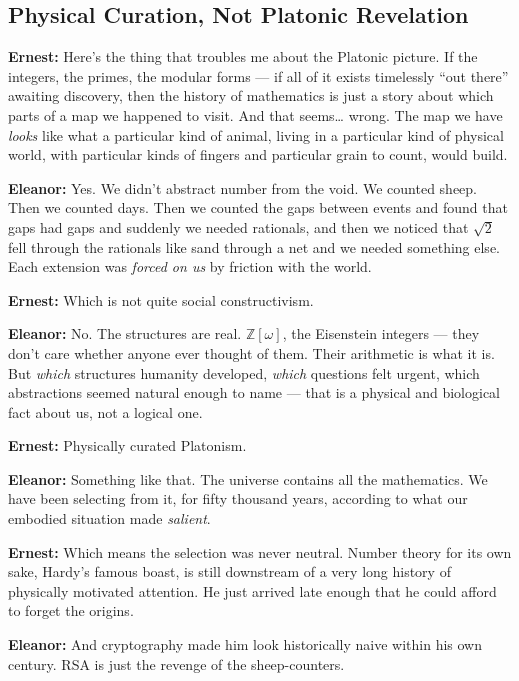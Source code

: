 \subsection*{Physical Curation, Not Platonic Revelation}
 
\noindent\textbf{Ernest:} Here's the thing that troubles me about the Platonic picture. If the integers,
the primes, the modular forms --- if all of it exists timelessly ``out there'' awaiting
discovery, then the history of mathematics is just a story about which parts of a map
we happened to visit. And that seems\ldots{} wrong. The map we have \textit{looks} like
what a particular kind of animal, living in a particular kind of physical world,
with particular kinds of fingers and particular grain to count, would build.
 
\noindent\textbf{Eleanor:} Yes. We didn't abstract number from the void. We counted sheep. Then we counted
days. Then we counted the gaps between events and found that gaps had gaps and
suddenly we needed rationals, and then we noticed that $\sqrt{2}$ fell through the
rationals like sand through a net and we needed something else. Each extension
was \textit{forced on us} by friction with the world.
 
\noindent\textbf{Ernest:} Which is not quite social constructivism.
 
\noindent\textbf{Eleanor:} No. The structures are real. $\mathbb{Z}[\omega]$, the Eisenstein integers --- they
don't care whether anyone ever thought of them. Their arithmetic is what it is.
But \textit{which} structures humanity developed, \textit{which} questions felt urgent,
which abstractions seemed natural enough to name --- that is a physical and biological
fact about us, not a logical one.
 
\noindent\textbf{Ernest:} Physically curated Platonism.
 
\noindent\textbf{Eleanor:} Something like that. The universe contains all the mathematics. We have been
selecting from it, for fifty thousand years, according to what our embodied
situation made \textit{salient}.
 
\noindent\textbf{Ernest:} Which means the selection was never neutral. Number theory for its own sake,
Hardy's famous boast, is still downstream of a very long history of physically
motivated attention. He just arrived late enough that he could afford to forget
the origins.
 
\noindent\textbf{Eleanor:} And cryptography made him look historically naive within his own century.
RSA is just the revenge of the sheep-counters.
 
